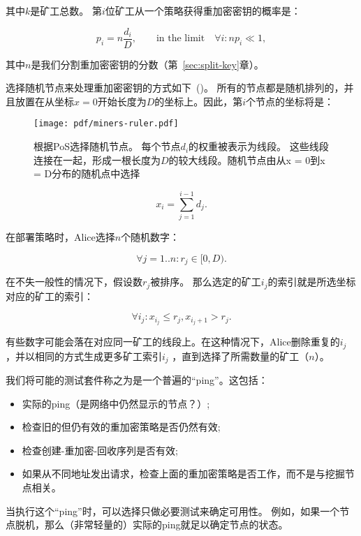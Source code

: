 \documentclass[longbibliography,nofootinbib]{revtex4-1}
\begin{document}
\begin{CJK*}{UTF8}{gbsn}
其中$k$是矿工总数。 第$i$位矿工从一个策略获得重加密密钥的概率是：

\begin{equation}
    p_i = n\frac{d_i}{D},\qquad\text{in the limit}\quad \forall i: n p_i \ll 1,
\end{equation}

	其中$n$是我们分割重加密密钥的分数（第~\ref{sec:split-key}章）。

    选择随机节点来处理重加密密钥的方式如下~()。 所有的节点都是随机排列的，并且放置在从坐标$x=0$开始长度为$D$的坐标上。因此，第$i$个节点的坐标将是：
    
\begin{figure}
    \centering
    \texttt{[image: pdf/miners-ruler.pdf]}
    \caption{根据PoS选择随机节点。 每个节点$d_i$的权重被表示为线段。 这些线段连接在一起，形成一根长度为$D$的较大线段。随机节点由从x = 0到x = D分布的随机点中选择}
    \label{fig:random-nodes}
\end{figure}
\begin{equation}
    x_i = \sum_{j=1}^{i-1} d_j.
\end{equation}

	在部署策略时，Alice选择$n$个随机数字：
    
\begin{equation}
    \forall j=1..n: r_j \in [0, D).
\end{equation}

	在不失一般性的情况下，假设数$r_j$被排序。 那么选定的矿工$i_j$的索引就是所选坐标对应的矿工的索引：

\begin{equation}
    \forall i_j: x_{i_j} \le r_j, x_{i_j + 1} > r_j.
\end{equation}

	有些数字可能会落在对应同一矿工的线段上。在这种情况下，Alice删除重复的$i_j$ ，并以相同的方式生成更多矿工索引$i_j$ ，直到选择了所需数量的矿工（$n$）。

	我们将可能的测试套件称之为是一个普遍的“ping”。这包括：
\begin{itemize}
    \item 实际的ping（是网络中仍然显示的节点？）;
    \item 检查旧的但仍有效的重加密策略是否仍然有效;
    \item 检查创建-重加密-回收序列是否有效;
    \item 如果从不同地址发出请求，检查上面的重加密策略是否工作，而不是与挖掘节点相关。
\end{itemize}
	当执行这个“ping”时，可以选择只做必要测试来确定可用性。 例如，如果一个节点脱机，那么（非常轻量的）实际的ping就足以确定节点的状态。
    

\end{CJK*}
\end{document}
